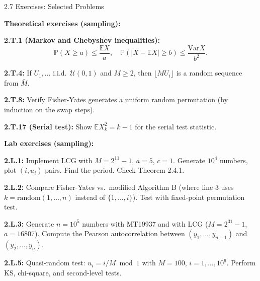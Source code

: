 \documentclass[aspectratio=169,10pt]{beamer}
\begin{document}
\begin{frame}[allowframebreaks]{2.7 Exercises: Selected Problems}

\textbf{Theoretical exercises (sampling):}

\medskip
\textbf{2.T.1 (Markov and Chebyshev inequalities):}
\[
  \mathbb{P}(X \ge a) \le \frac{\mathbb{E}X}{a}, \quad
  \mathbb{P}(|X - \mathbb{E}X| \ge b) \le \frac{\mathrm{Var}X}{b^2}.
\]

\medskip
\textbf{2.T.4:} If $U_1,\ldots$ i.i.d.\ $\mathcal{U}(0,1)$ and $M \ge 2$, then
$\lfloor M U_i \rfloor$ is a random sequence from $\bar{M}$.

\medskip
\textbf{2.T.8:} Verify Fisher-Yates generates a uniform random permutation
(by induction on the swap steps).

\medskip
\textbf{2.T.17 (Serial test):} Show $\mathbb{E}X_k^2 = k-1$ for the serial test statistic.

\framebreak

\textbf{Lab exercises (sampling):}

\medskip
\textbf{2.L.1:} Implement LCG with $M=2^{11}-1$, $a=5$, $c=1$. Generate $10^4$
numbers, plot $(i, u_i)$ pairs. Find the period. Check Theorem 2.4.1.

\medskip
\textbf{2.L.2:} Compare Fisher-Yates vs.\ modified Algorithm B (where line 3 uses
$k = \text{random}(1,\ldots,n)$ instead of $\{1,\ldots,i\}$). Test with
fixed-point permutation test.

\medskip
\textbf{2.L.3:} Generate $n=10^5$ numbers with MT19937 and with LCG
($M=2^{31}-1$, $a=16807$). Compute the Pearson autocorrelation between
$(y_1,\ldots,y_{n-1})$ and $(y_2,\ldots,y_n)$.

\medskip
\textbf{2.L.5:} Quasi-random test: $u_i = i/M \bmod 1$ with $M=100$, $i=1,\ldots,10^6$.
Perform KS, chi-square, and second-level tests.

\end{frame}
\end{document}
